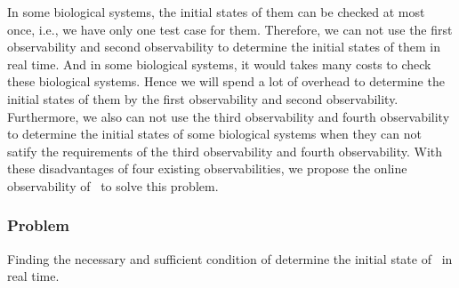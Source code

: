 In some biological systems, the initial states of them can be checked at most once, i.e., we have only one test case for them. Therefore, we can not use the first observability and second observability to determine the initial states of them in real time. And in some biological systems, it would takes many costs to check these biological systems. Hence we will spend a lot of overhead to determine the initial states of them by the first observability and second observability. Furthermore, we also can not use the third observability and fourth observability to determine the initial states of some biological systems when they can not satify the requirements of the third observability and fourth observability. With these disadvantages of four existing observabilities, we propose the online observability of \BCNs\ to solve this problem.
 \subsubsection*{Problem}
Finding the necessary and sufficient condition of determine the initial state of \BCNs\ in real time.